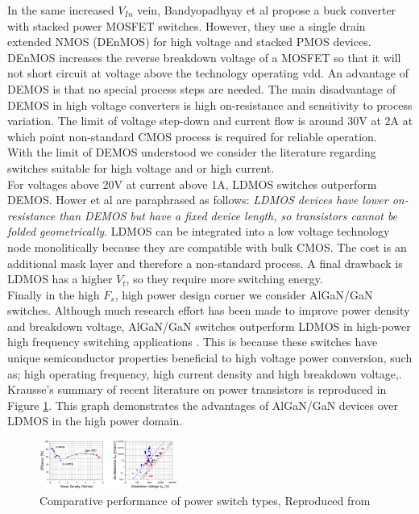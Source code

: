 \documentclass[letterpaper,twocolumn,10pt]{article}
\begin{document}
\indent In the same increased $V_{In}$ vein, Bandyopadhyay et al\cite{Bandyopadhyay2011} propose a buck converter with stacked power MOSFET switches. However, they use a single drain extended NMOS (DEnMOS) for high voltage and stacked PMOS devices. DEnMOS increases the reverse breakdown voltage of a MOSFET so that it will not short circuit at voltage above the technology operating vdd. An advantage of DEMOS is that no special process steps are needed. The main disadvantage of DEMOS in high voltage converters is high on-resistance and sensitivity to process variation. The limit of voltage step-down and current flow is around 30V at 2A \cite{Hower2005} at which point non-standard CMOS process is required for reliable operation.\\
\indent With the limit of DEMOS understood we consider the literature regarding switches suitable for high voltage and or high current.\\
For voltages above 20V at current above 1A, LDMOS switches outperform DEMOS. Hower et al\cite{Hower2005} are paraphrased as follows: \textit{LDMOS devices have lower on-resistance than DEMOS but have a fixed device length, so transistors cannot be folded geometrically}. LDMOS can be integrated into a low voltage technology node monolitically because they are compatible with bulk CMOS. The cost is an additional mask layer and therefore a non-standard process. A final drawback is LDMOS has a higher $V_t$, so they require more switching energy.\\
\indent Finally in the high $F_s$, high power design corner we consider AlGaN/GaN switches. Although much research effort has been made to improve power density and breakdown voltage, AlGaN/GaN switches outperform LDMOS in high-power high frequency switching applications \cite{Goyal2013}. This is because these switches have unique semiconductor properties beneficial to high voltage power conversion, such as; high operating frequency, high current density and high breakdown voltage\cite{Alamo2009},\cite{Mustapha2008}. Krausse's\cite{Krausse2013} summary of recent literature on power transistors is reproduced in Figure \ref{GaNCharacter}. This graph demonstrates the advantages of AlGaN/GaN devices over LDMOS in the high power domain.\\ %
\begin{figure}[here]
\includegraphics[width=0.4\textwidth]{TransistorPerf}
\caption{Comparative performance of power switch types, Reproduced from\cite{Krausse2013}}
\label{GaNCharacter}
\end{figure}
\end{document}
